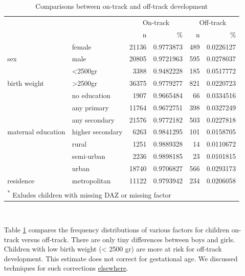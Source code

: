 \documentclass[
]{book}
\begin{document}
\begin{table}

\caption{\label{tab:ontracktab}Comparisons between on-track and off-track development}
\centering
\begin{tabular}[t]{l|l|r|r|r|r}
\hline
\multicolumn{2}{c|}{ } & \multicolumn{2}{c|}{On-track} & \multicolumn{2}{c}{Off-track} \\
\cline{3-4} \cline{5-6}
 &  & n & \% & n & \%\\
\hline
 & female & 21136 & 0.9773873 & 489 & 0.0226127\\
\cline{2-6}
\multirow[t]{-2}{*}{\raggedright\arraybackslash sex} & male & 20805 & 0.9721963 & 595 & 0.0278037\\
\cline{1-6}
 & <2500gr & 3388 & 0.9482228 & 185 & 0.0517772\\
\cline{2-6}
\multirow[t]{-2}{*}{\raggedright\arraybackslash birth weight} & >2500gr & 36375 & 0.9779277 & 821 & 0.0220723\\
\cline{1-6}
 & no education & 1907 & 0.9665484 & 66 & 0.0334516\\
\cline{2-6}
 & any primary & 11764 & 0.9672751 & 398 & 0.0327249\\
\cline{2-6}
 & any secondary & 21576 & 0.9772182 & 503 & 0.0227818\\
\cline{2-6}
\multirow[t]{-4}{*}{\raggedright\arraybackslash maternal education} & higher secondary & 6263 & 0.9841295 & 101 & 0.0158705\\
\cline{1-6}
 & rural & 1251 & 0.9889328 & 14 & 0.0110672\\
\cline{2-6}
 & semi-urban & 2236 & 0.9898185 & 23 & 0.0101815\\
\cline{2-6}
 & urban & 18740 & 0.9706827 & 566 & 0.0293173\\
\cline{2-6}
\multirow[t]{-4}{*}{\raggedright\arraybackslash residence} & metropolitan & 11122 & 0.9793942 & 234 & 0.0206058\\
\hline
\multicolumn{6}{l}{\textsuperscript{*} Exludes children with missing DAZ or missing factor}\\
\end{tabular}
\end{table}

~

Table \ref{tab:ontracktab} compares the frequency distributions of various factors for children on-track versus off-track. There are only tiny differences between boys and girls. Children with low birth weight (\textless{} 2500 gr) are more at risk for off-track development. This estimate does not correct for gestational age. We discussed techniques for such corrections \href{https://d-score.org/dbook1/sec-pops.html}{elsewhere}.
\end{document}
